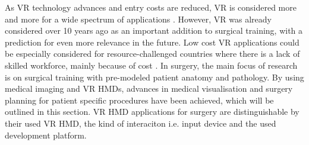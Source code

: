 As VR technology advances and entry costs are reduced, VR is considered more and more for a wide spectrum of applications \cite{Ayoub.2019, Berni.2020}.
\newline
However, VR was already considered over 10 years ago as an important addition to surgical training, with a prediction for even more relevance in the future.
Low cost VR applications could be especially considered for resource-challenged countries where there is a lack of skilled workforce, mainly because of cost \cite{RN60}.
\newline
In surgery, the main focus of research is on surgical training with pre-modeled patient anatomy and pathology.
By using medical imaging and VR HMDs, advances in medical visualisation and surgery planning for patient specific procedures have been achieved, which will be outlined in this section.
VR HMD applications for surgery are distinguishable by their used VR HMD, the kind of interaciton i.e. input device and the used development platform.













